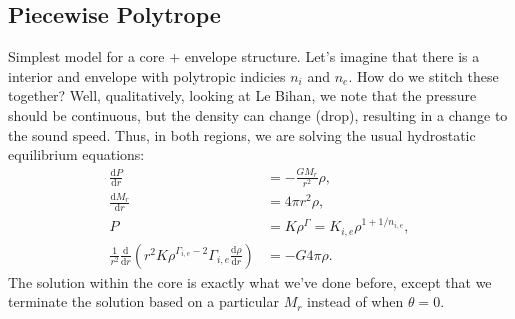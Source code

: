 \documentclass[11pt,
        usenames, %
        twocolumn,
        landscape,
        dvipsnames %
    ]{article}
\newcommand*{\rd}[2]{\frac{\mathrm{d}#1}{\mathrm{d}#2}}
\newcommand*{\p}[1]{\left(#1\right)}
\begin{document}
\subsection{Piecewise Polytrope}

Simplest model for a core + envelope structure. Let's imagine that there is a
interior and envelope with polytropic indicies $n_i$ and $n_e$. How do we stitch
these together? Well, qualitatively, looking at Le Bihan, we note that the
pressure should be continuous, but the density can change (drop), resulting in a
change to the sound speed. Thus, in both regions, we are solving the usual
hydrostatic equilibrium equations:
\begin{align}
    \rd{P}{r} &= -\frac{GM_r}{r^2}\rho,\\
    \rd{M_r}{r} &= 4\pi r^2\rho,\\
    P &= K\rho^\Gamma = K_{i, e}\rho^{1 + 1/n_{i, e}},\\
    \frac{1}{r^2}\rd{}{r}\p{r^2 K\rho^{\Gamma_{i, e} - 2}\Gamma_{i, e}
        \rd{\rho}{r}} &= -G 4\pi \rho.
\end{align}
The solution within the core is exactly what we've done before, except that we
terminate the solution based on a particular $M_r$ instead of when $\theta = 0$.
\end{document}
